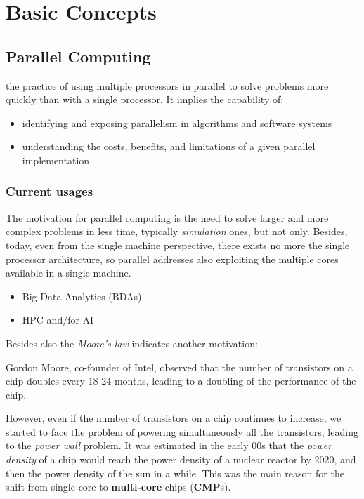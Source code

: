 \chapter{Basic Concepts}
\label{ch:basic-concepts}


\section{Parallel Computing}
\begin{definition}
   the practice of using multiple processors in parallel to solve problems more quickly than with a single processor. It implies the capability of:
   \begin{itemize}
      \item
      identifying and exposing parallelism in algorithms and software systems
      \item
      understanding the costs, benefits, and limitations of a given parallel implementation
   \end{itemize}
\end{definition}

\subsection{Current usages}
The motivation for parallel computing is the need to solve larger and more complex problems in less time, typically \textit{simulation} ones, but not only.
Besides, today, even from the single machine perspective, there exists no more the single processor architecture, so parallel addresses also exploiting the multiple cores available in a single machine.

\begin{itemize}
   \item Big Data Analytics (BDAs)
   \item HPC and/for AI
\end{itemize}

Besides also the \textit{Moore's law} indicates another motivation:
\begin{definition}
   Gordon Moore, co-founder of Intel, observed that the number of transistors on a chip doubles\textbf{} every 18-24 months, leading to a doubling of the performance of the chip.
\end{definition}
However, even if the number of transistors on a chip continues to increase, we started to face the problem of powering simultaneously all the transistors, leading to the \textit{power wall} problem.
It was estimated in the early 00s that the \textit{power density} of a chip would reach the power density of a nuclear reactor by 2020, and then the power density of the sun in a while.
This was the main reason for the shift from single-core to \textbf{multi-core} chips (\textbf{CMP}s).

